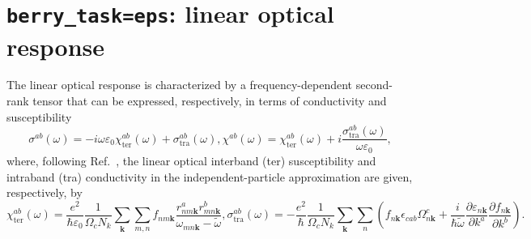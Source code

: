 \section{{\tt berry\_task=eps}: linear optical response}
\label{sec:eps}

The linear optical response is characterized by a frequency-dependent second-rank tensor that can be expressed, respectively, in terms of conductivity and susceptibility
\begin{subequations}
 \begin{equation}
  \sigma^{ab}(\omega)=-i\omega\varepsilon_{0}\chi^{ab}_{\mathrm{ter}}(\omega)+\sigma^{ab}_{\mathrm{tra}}(\omega),
 \end{equation}
 \begin{equation}
  \chi^{ab}(\omega)=\chi^{ab}_{\mathrm{ter}}(\omega)+i\frac{\sigma^{ab}_{\mathrm{tra}}(\omega)}{\omega\varepsilon_{0}},
 \end{equation}
\end{subequations}
where, following Ref.~\cite{sipe-prb00}, the linear optical interband (ter) susceptibility and intraband (tra) conductivity in the independent-particle approximation are given, respectively, by~\cite{garcia-goiricelaya-prb23}
\begin{subequations}
 \begin{equation}\label{eq:linterchi}
  \chi^{ab}_{\mathrm{ter}}(\omega)=\frac{e^{2}}{\hbar\varepsilon_{0}}\frac{1}{\Omega_{c}N_{k}}\sum_{\mathbf{k}}\sum_{m,n}f_{nm\mathbf{k}}\frac{r^{a}_{nm\mathbf{k}}r^{b}_{mn\mathbf{k}}}{\omega_{mn\mathbf{k}}-\tilde{\omega}},
 \end{equation}
 \begin{equation}\label{eq:lintrasigma}
  \sigma^{ab}_{\mathrm{tra}}(\omega)=-\frac{e^{2}}{\hbar}\frac{1}{\Omega_{c}N_{k}}\sum_{\mathbf{k}}\sum_{n}\left(f_{n\mathbf{k}}\epsilon_{cab}\Omega^{c}_{n\mathbf{k}}+\frac{i}{\hbar\tilde{\omega}}\frac{\partial \varepsilon_{n\mathbf{k}}}{\partial k^{a}}\frac{\partial f_{n\mathbf{k}}}{\partial k^{b}}\right).
 \end{equation}
\end{subequations}
